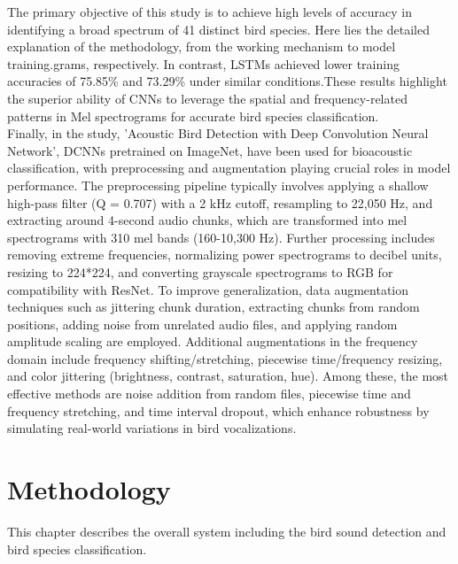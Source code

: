 The primary objective of this study is to achieve high levels of accuracy in
identifying a broad spectrum of 41 distinct bird species. Here lies the
detailed explanation of the methodology, from the working mechanism to model
training.grams, respectively. In contrast, LSTMs achieved lower training
accuracies of 75.85\% and 73.29\% under similar conditions.These results
highlight the superior ability of CNNs to leverage the spatial and
frequency-related patterns in Mel spectrograms for accurate bird species
classification.\\

Finally, in the study\cite{lasseck2018acoustic}, 'Acoustic Bird Detection with
Deep Convolution Neural Network', DCNNs pretrained on ImageNet, have been used
for bioacoustic classification, with preprocessing and augmentation playing
crucial roles in model performance. The preprocessing pipeline typically
involves applying a shallow high-pass filter (Q = 0.707) with a 2 kHz cutoff,
resampling to 22,050 Hz, and extracting around 4-second audio chunks, which are
transformed into mel spectrograms with 310 mel bands (160-10,300 Hz). Further
processing includes removing extreme frequencies, normalizing power
spectrograms to decibel units, resizing to 224*224, and converting grayscale
spectrograms to RGB for compatibility with ResNet. To improve generalization,
data augmentation techniques such as jittering chunk duration, extracting
chunks from random positions, adding noise from unrelated audio files, and
applying random amplitude scaling are employed. Additional augmentations in the
frequency domain include frequency shifting/stretching, piecewise
time/frequency resizing, and color jittering (brightness, contrast, saturation,
hue). Among these, the most effective methods are noise addition from random
files, piecewise time and frequency stretching, and time interval dropout,
which enhance robustness by simulating real-world variations in bird
vocalizations.\\

\chapter{Methodology}
This chapter describes the overall system including the bird sound detection
and bird species classification.

